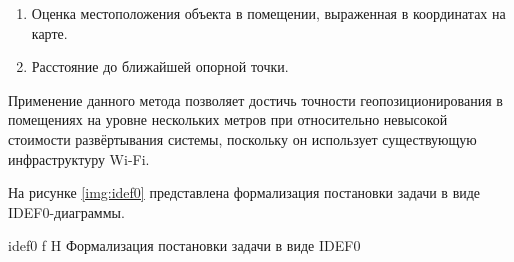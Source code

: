 \begin{enumerate}
    \item Оценка местоположения объекта в помещении, выраженная в координатах на карте.
    \item Расстояние до ближайшей опорной точки.
\end{enumerate}

Применение данного метода позволяет достичь точности геопозиционирования в помещениях на уровне нескольких метров при относительно невысокой стоимости развёртывания системы, поскольку он использует существующую инфраструктуру Wi-Fi.

\clearpage

На рисунке \ref{img:idef0} представлена формализация постановки задачи в виде IDEF0-диаграммы.

    {idef0}
    {f}
    {H}
    {\linewidth}
    {Формализация постановки задачи в виде IDEF0}
